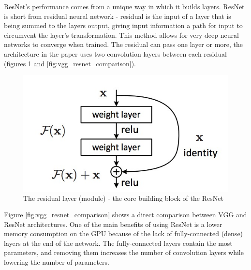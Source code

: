 \documentclass[times, utf8, diplomski]{fer}
\begin{document}
ResNet's performance comes from a unique way in which it builds layers. ResNet is short from residual neural network - residual is the input of a layer that is being summed to the layers output, giving input information a path for input to circumvent the layer's transformation. This method allows for very deep neural networks to converge when trained. The residual can pass one layer or more, the architecture in the paper uses two convolution layers between each residual (figures \ref{fig:residual_layer} and \ref{fig:vgg_resnet_comparison}).

\begin{figure}
  \includegraphics[scale=0.55]{figures/resiudal_layer.jpg}
  \centering
  \caption{The residual layer (module) - the core building block of the ResNet }
  \label{fig:residual_layer}
\end{figure}

Figure \ref{fig:vgg_resnet_comparison} shows a direct comparison between VGG and ResNet architectures. One of the main benefits of using ResNet is a lower memory consumption on the GPU because of the lack of fully-connected (dense) layers at the end of the network. The fully-connected layers contain the most parameters, and removing them increases the number of convolution layers while lowering the number of parameters.
\end{document}
